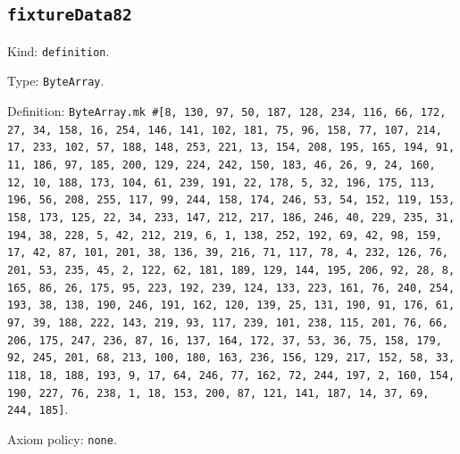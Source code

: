 \documentclass[11pt]{article}
\begin{document}
\subsection*{\texttt{fixtureData82}}
\noindent Kind: \texttt{definition}.\par
\noindent Type: \texttt{ByteArray}.\par
\noindent Definition: \texttt{ByteArray.mk \#[8, 130, 97, 50, 187, 128, 234, 116, 66, 172, 27, 34, 158, 16, 254, 146, 141, 102, 181, 75, 96, 158, 77, 107, 214, 17, 233, 102, 57, 188, 148, 253, 221, 13, 154, 208, 195, 165, 194, 91, 11, 186, 97, 185, 200, 129, 224, 242, 150, 183, 46, 26, 9, 24, 160, 12, 10, 188, 173, 104, 61, 239, 191, 22, 178, 5, 32, 196, 175, 113, 196, 56, 208, 255, 117, 99, 244, 158, 174, 246, 53, 54, 152, 119, 153, 158, 173, 125, 22, 34, 233, 147, 212, 217, 186, 246, 40, 229, 235, 31, 194, 38, 228, 5, 42, 212, 219, 6, 1, 138, 252, 192, 69, 42, 98, 159, 17, 42, 87, 101, 201, 38, 136, 39, 216, 71, 117, 78, 4, 232, 126, 76, 201, 53, 235, 45, 2, 122, 62, 181, 189, 129, 144, 195, 206, 92, 28, 8, 165, 86, 26, 175, 95, 223, 192, 239, 124, 133, 223, 161, 76, 240, 254, 193, 38, 138, 190, 246, 191, 162, 120, 139, 25, 131, 190, 91, 176, 61, 97, 39, 188, 222, 143, 219, 93, 117, 239, 101, 238, 115, 201, 76, 66, 206, 175, 247, 236, 87, 16, 137, 164, 172, 37, 53, 36, 75, 158, 179, 92, 245, 201, 68, 213, 100, 180, 163, 236, 156, 129, 217, 152, 58, 33, 118, 18, 188, 193, 9, 17, 64, 246, 77, 162, 72, 244, 197, 2, 160, 154, 190, 227, 76, 238, 1, 18, 153, 200, 87, 121, 141, 187, 14, 37, 69, 244, 185]}.\par
\noindent Axiom policy: \texttt{none}.\par
\end{document}
